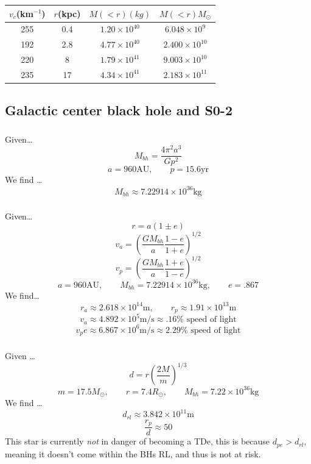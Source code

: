 \documentclass{article}
\begin{document}
\begin{center}
    \begin{tabular}{|c|c|c|c|}
        \hline
        \(v_c\)(km\(^{-1}\)) &\(r\)(kpc)&\(M(<r)(kg)\) & \(M(<r) M_\odot\) \\
        \hline
        255 & 0.4 & \(1.20\times 10^{40}\)  & \(6.048 \times 10^{9}    \)\\
        192 & 2.8 & \(4.77\times 10^{40}\)  & \(2.400 \times 10^{10} \)\\
        220 & 8   & \(1.79 \times 10^{41}\) & \(9.003 \times 10^{10} \)\\
        235 & 17  & \(4.34\times 10^{41}\)  & \(2.183 \times 10^{11} \)\\
        \hline
    \end{tabular}
\end{center}

\subsection{Galactic center black hole and S0-2}
\subsubsection{}
Given\dots
\[M_{bh} = \frac{4\pi^2a^3}{Gp^2}\] 
\[a = 960\text{AU}, \qquad p = 15.6\text{yr}\]
We find \dots
\[\boxed{M_{bh} \approx 7.22914 \times 10^{36} \text{kg}}\]
\subsubsection{}
Given\dots
\[r = a(1\pm e)\]
\[v_a = \left(\frac{GM_{bh}}{a} \frac{1-e}{1+e}\right)^{1/2}\]
\[v_p = \left(\frac{GM_{bh}}{a} \frac{1+e}{1-e}\right)^{1/2}\]
\[a = 960 \text{AU}, \qquad M_{bh} = 7.22914 \times 10^{36} \text{kg}, \qquad e =  .867\]
We find\dots
\[\boxed{r_a \approx 2.618 \times 10^{14} \text{m}}, \qquad \boxed{r_p \approx 1.91 \times 10^{13}\text{m}}\]
\[\boxed{v_a \approx 4.892 \times 10^{5}\text{m/s} \approx .16\% \text{ speed of light}}\]
\[\boxed{v_pe \approx 6.867 \times 10^{6}\text{m/s} \approx 2.29\% \text{ speed of light}}\]

\subsubsection{}
Given \dots
\[d = r\left(\frac{2M}{m}\right)^{1/3}\]
\[m = 17.5 M_\odot, \qquad r = 7.4R_\odot, \qquad M_{bh} = 7.22 \times 10^{36} \text{kg}\]
We find \dots
\[\boxed{d_{rl} \approx 3.842 \times 10^{11}\text{m}}\]
\[ \frac{r_p}{d} \approx 50\]
This star is currently \textit{not} in danger of becoming a TDe, this is because \(\boxed{d_{pe} > d_{rl}}\), meaning it doesn't come within the BHs RL, and thus is not at risk.
\end{document}
